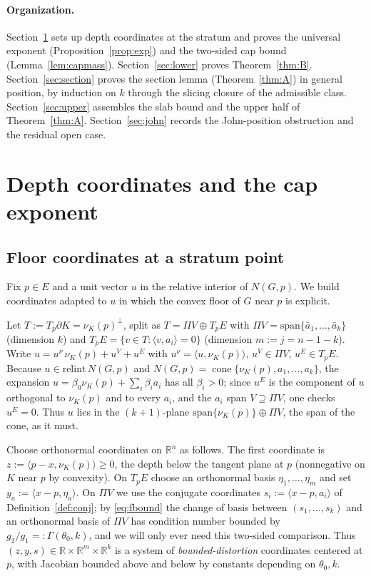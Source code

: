 \documentclass[11pt]{article}
\theoremstyle{definition}
\theoremstyle{remark}
\newcommand{\R}{\mathbb{R}}
\newcommand{\cone}{\operatorname{cone}}
\newcommand{\nor}{\nu_K}
\begin{document}
\paragraph{Organization.}
Section~\ref{sec:caps} sets up depth coordinates at the stratum and proves the
universal exponent (Proposition~\ref{prop:exp}) and the two-sided cap bound
(Lemma~\ref{lem:capmass}).  Section~\ref{sec:lower} proves
Theorem~\ref{thm:B}.  Section~\ref{sec:section} proves the section lemma
(Theorem~\ref{thm:A}) in general position, by induction on $k$ through the
slicing closure of the admissible class.  Section~\ref{sec:upper} assembles the
slab bound and the upper half of Theorem~\ref{thm:A}.  Section~\ref{sec:john}
records the John-position obstruction and the residual open case.

\section{Depth coordinates and the cap exponent}\label{sec:caps}

\subsection{Floor coordinates at a stratum point}\label{ss:floor}

Fix $p\in E$ and a unit vector $u$ in the relative interior of $N(G,p)$.  We
build coordinates adapted to $u$ in which the convex floor of $G$ near $p$ is
explicit.

Let $T:=T_p\partial K=\nor(p)^\perp$, split as $T=\Pi V\oplus T_pE$ with
$\Pi V=\mathrm{span}\{\bar a_1,\dots,\bar a_k\}$ (dimension $k$) and
$T_pE=\{v\in T:\langle v,a_i\rangle=0\}$ (dimension $m:=j=n-1-k$).  Write
$u=u^\nu\,\nor(p)+u^V+u^E$ with $u^\nu=\langle u,\nor(p)\rangle$,
$u^V\in\Pi V$, $u^E\in T_pE$.  Because $u\in\mathrm{relint}\,N(G,p)$ and
$N(G,p)=\cone\{\nor(p),a_1,\dots,a_k\}$, the expansion
$u=\beta_0\nor(p)+\sum_i\beta_ia_i$ has all $\beta_i>0$; since $u^E$ is the
component of $u$ orthogonal to $\nor(p)$ and to every $a_i$, and the $a_i$ span
$V\supseteq\Pi V$, one checks $u^E=0$.  Thus $u$ lies in the
$(k+1)$-plane $\mathrm{span}\{\nor(p)\}\oplus\Pi V$, the span of the cone, as it
must.

Choose orthonormal coordinates on $\R^n$ as follows.  The first coordinate is
$z:=\langle p-x,\nor(p)\rangle\ge0$, the depth below the tangent plane at $p$
(nonnegative on $K$ near $p$ by convexity).  On $T_pE$ choose an orthonormal
basis $\eta_1,\dots,\eta_m$ and set $y_a:=\langle x-p,\eta_a\rangle$.  On
$\Pi V$ we use the conjugate coordinates
$s_i:=\langle x-p,a_i\rangle$ of Definition~\ref{def:conj}; by
\eqref{eq:fbound} the change of basis between $(s_1,\dots,s_k)$ and an
orthonormal basis of $\Pi V$ has condition number bounded by
$g_2/g_1=:\Gamma(\theta_0,k)$, and we will only ever need this two-sided
comparison.  Thus $(z,y,s)\in\R\times\R^m\times\R^k$ is a system of
\emph{bounded-distortion} coordinates centered at $p$, with Jacobian bounded
above and below by constants depending on $\theta_0,k$.
\end{document}
